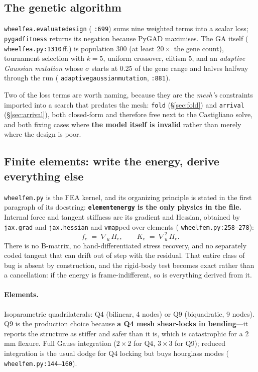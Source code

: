 \documentclass[11pt,a4paper]{article}
\DeclareRobustCommand{\code}[1]{%
  \texttt{\small\def\_{\textunderscore\discretionary{}{}{}}#1}}
\newcommand{\at}[2]{\code{#1:#2}}
\begin{document}
\subsection{The genetic algorithm}

\code{wheel\_fea.evaluate\_design} (\code{:699}) sums nine weighted terms into a scalar
loss; \code{pygad\_fitness} returns its negation because PyGAD maximises. The GA itself
(\at{wheel\_fea.py}{1310}\,ff.) is population 300 (at least $20\times$ the gene count),
tournament selection with $k=5$, uniform crossover, elitism 5, and an \emph{adaptive
Gaussian mutation} whose $\sigma$ starts at 0.25 of the gene range and halves halfway
through the run (\code{adaptive\_gaussian\_mutation}, \code{:881}).

Two of the loss terms are worth naming, because they are the \emph{mesh's} constraints
imported into a search that predates the mesh: \code{fold} (\S\ref{sec:fold}) and
\code{arrival} (\S\ref{sec:arrival}), both closed-form and therefore free next to the
Castigliano solve, and both fixing cases where \textbf{the model itself is invalid}
rather than merely where the design is poor.

\subsection{Finite elements: write the energy, derive everything else}
\label{sec:fem}

\code{wheel\_fem.py} is the FEA kernel, and its organizing principle is stated in the
first paragraph of its docstring: \textbf{\code{element\_energy} is the only physics in
the file.} Internal force and tangent stiffness are its gradient and Hessian, obtained
by \code{jax.grad} and \code{jax.hessian} and \code{vmap}ped over elements
(\at{wheel\_fem.py}{258--278}):
%
\begin{equation}
  f_e \;=\; \nabla_{u}\,\Pi_e,
  \qquad
  K_e \;=\; \nabla^2_{u}\,\Pi_e .
\end{equation}
%
There is no B-matrix, no hand-differentiated stress recovery, and no separately coded
tangent that can drift out of step with the residual. That entire class of bug is
absent by construction, and the rigid-body test becomes exact rather than a
cancellation: if the energy is frame-indifferent, so is everything derived from it.

\paragraph{Elements.}
Isoparametric quadrilaterals: Q4 (bilinear, 4 nodes) or Q9 (biquadratic, 9 nodes). Q9
is the production choice because \textbf{a Q4 mesh shear-locks in bending}---it reports
the structure as stiffer and safer than it is, which is catastrophic for a 2\,mm
flexure. Full Gauss integration ($2\times2$ for Q4, $3\times3$ for Q9); reduced
integration is the usual dodge for Q4 locking but buys hourglass modes
(\at{wheel\_fem.py}{144--160}).
\end{document}
